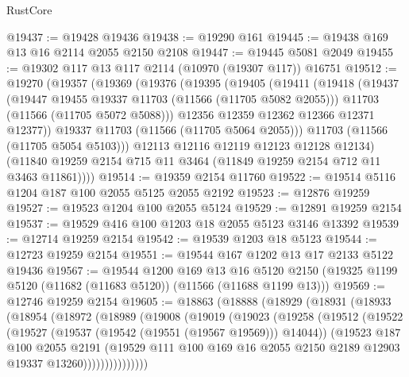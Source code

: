 \begin{lexlean}{RustCore}
\begin{coremodule}
@19437 := @19428 @19436
@19438 := @19290 @161
@19445 := @19438 @169 @13 @16 @2114 @2055 @2150 @2108
@19447 := @19445 @5081 @2049
@19455 := @19302 @117 @13 @117 @2114 (@10970 (@19307 @117)) @16751
@19512 := @19270
    (@19357
      (@19369
        (@19376
          (@19395
            (@19405
              (@19411
                (@19418
                  (@19437
                    (@19447 @19455 @19337 @11703 (@11566 (@11705 @5082 @2055)))
                    @11703
                    (@11566 (@11705 @5072 @5088)))
                  @12356
                  @12359
                  @12362
                  @12366
                  @12371
                  @12377))
              @19337
              @11703
              (@11566 (@11705 @5064 @2055)))
            @11703
            (@11566 (@11705 @5054 @5103)))
          @12113
          @12116
          @12119
          @12123
          @12128
          @12134)
        (@11840 @19259 @2154 @715 @11 @3464 (@11849 @19259 @2154 @712 @11 @3463 @11861))))
@19514 := @19359 @2154 @11760
@19522 := @19514 @5116 @1204 @187 @100 @2055 @5125 @2055 @2192
@19523 := @12876 @19259
@19527 := @19523 @1204 @100 @2055 @5124
@19529 := @12891 @19259 @2154
@19537 := @19529 @416 @100 @1203 @18 @2055 @5123 @3146 @13392
@19539 := @12714 @19259 @2154
@19542 := @19539 @1203 @18 @5123
@19544 := @12723 @19259 @2154
@19551 := @19544 @167 @1202 @13 @17 @2133 @5122 @19436
@19567 := @19544
    @1200
    @169
    @13
    @16
    @5120
    @2150
    (@19325 @1199 @5120 (@11682 (@11683 @5120)) (@11566 (@11688 @1199 @13)))
@19569 := @12746 @19259 @2154
@19605 := @18863
    (@18888
      (@18929
        (@18931
          (@18933
            (@18954
              (@18972
                (@18989
                  (@19008
                    (@19019
                      (@19023
                        (@19258
                          (@19512
                            (@19522
                              (@19527 (@19537 (@19542 (@19551 (@19567 @19569))) @14044))
                              (@19523
                                @187
                                @100
                                @2055
                                @2191
                                (@19529
                                  @111
                                  @100
                                  @169
                                  @16
                                  @2055
                                  @2150
                                  @2189
                                  @12903
                                  @19337
                                  @13260)))))))))))))))

\end{coremodule}
\end{lexlean}
